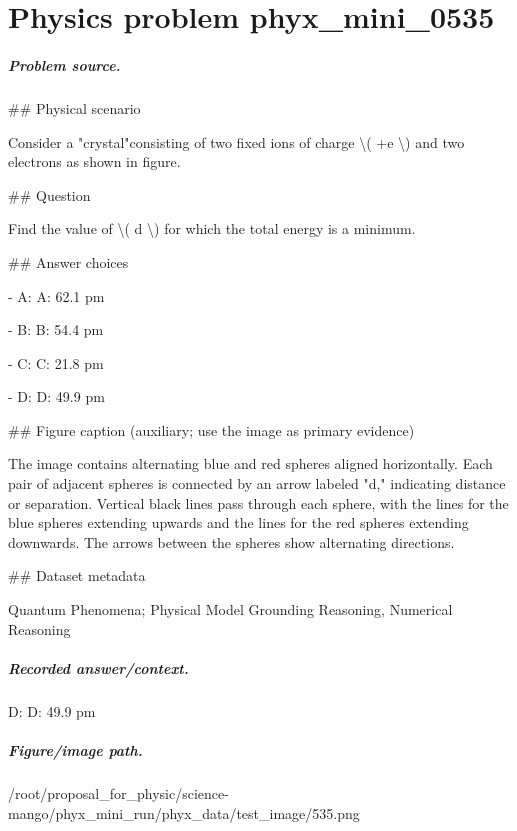 
\chapter{Physics problem phyx\_mini\_0535}
\label{ch:PhyXMiniProblems_problem_phyx_mini_0535}

\paragraph{Problem source.}
\#\# Physical scenario

Consider a "crystal"consisting of two fixed ions of charge \textbackslash{}( +e \textbackslash{}) and two electrons as shown in figure.

\#\# Question

Find the value of \textbackslash{}( d \textbackslash{}) for which the total energy is a minimum.

\#\# Answer choices

- A: A: 62.1 pm

- B: B: 54.4 pm

- C: C: 21.8 pm

- D: D: 49.9 pm

\#\# Figure caption (auxiliary; use the image as primary evidence)

The image contains alternating blue and red spheres aligned horizontally. Each pair of adjacent spheres is connected by an arrow labeled "d," indicating distance or separation. Vertical black lines pass through each sphere, with the lines for the blue spheres extending upwards and the lines for the red spheres extending downwards. The arrows between the spheres show alternating directions.

\#\# Dataset metadata

Quantum Phenomena; Physical Model Grounding Reasoning, Numerical Reasoning

\paragraph{Recorded answer/context.}
D: D: 49.9 pm

\paragraph{Figure/image path.}
/root/proposal\_for\_physic/science-mango/phyx\_mini\_run/phyx\_data/test\_image/535.png

